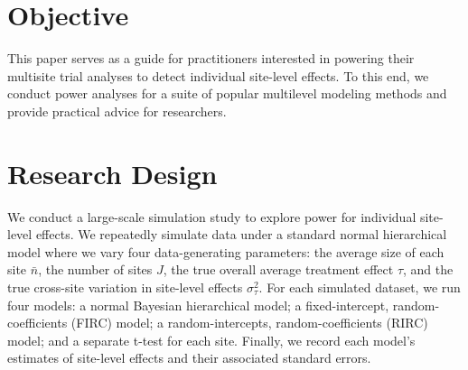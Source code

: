 \documentclass[]{article}
\begin{document}
\section{Objective}

This paper serves as a guide for practitioners interested in powering their multisite trial analyses to detect individual site-level effects. 
To this end, we conduct power analyses for a suite of popular multilevel modeling methods and provide practical advice for researchers.


\section{Research Design}

We conduct a large-scale simulation study to explore power for individual site-level effects. 
We repeatedly simulate data under a standard normal hierarchical model
where we vary four data-generating parameters: the average size of each site $\bar{n}$, the number of sites $J$, the true overall average treatment effect $\tau$, and the true cross-site variation in site-level effects $\sigma^2_\tau$.
For each simulated dataset, we run four models: a normal Bayesian hierarchical model; a fixed-intercept, random-coefficients (FIRC) model; a random-intercepts, random-coefficients (RIRC) model; and a separate t-test for each site. Finally, we record each model’s estimates of site-level effects and their associated standard errors.
\end{document}
